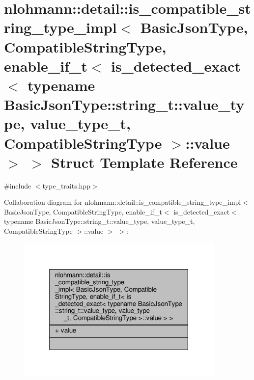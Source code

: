 \hypertarget{structnlohmann_1_1detail_1_1is__compatible__string__type__impl_3_01_basic_json_type_00_01_compat6590904cab40fc73f430e4c7518179a2}{}\section{nlohmann\+:\+:detail\+:\+:is\+\_\+compatible\+\_\+string\+\_\+type\+\_\+impl$<$ Basic\+Json\+Type, Compatible\+String\+Type, enable\+\_\+if\+\_\+t$<$ is\+\_\+detected\+\_\+exact$<$ typename Basic\+Json\+Type\+:\+:string\+\_\+t\+:\+:value\+\_\+type, value\+\_\+type\+\_\+t, Compatible\+String\+Type $>$\+:\+:value $>$ $>$ Struct Template Reference}
\label{structnlohmann_1_1detail_1_1is__compatible__string__type__impl_3_01_basic_json_type_00_01_compat6590904cab40fc73f430e4c7518179a2}


{\ttfamily \#include $<$type\+\_\+traits.\+hpp$>$}



Collaboration diagram for nlohmann\+:\+:detail\+:\+:is\+\_\+compatible\+\_\+string\+\_\+type\+\_\+impl$<$ Basic\+Json\+Type, Compatible\+String\+Type, enable\+\_\+if\+\_\+t$<$ is\+\_\+detected\+\_\+exact$<$ typename Basic\+Json\+Type\+:\+:string\+\_\+t\+:\+:value\+\_\+type, value\+\_\+type\+\_\+t, Compatible\+String\+Type $>$\+:\+:value $>$ $>$\+:\nopagebreak
\begin{figure}[H]
\begin{center}
\leavevmode
\includegraphics[width=291pt]{structnlohmann_1_1detail_1_1is__compatible__string__type__impl_3_01_basic_json_type_00_01_compat85df5388ff60fd9f2e32636cdd05b025}
\end{center}
\end{figure}
